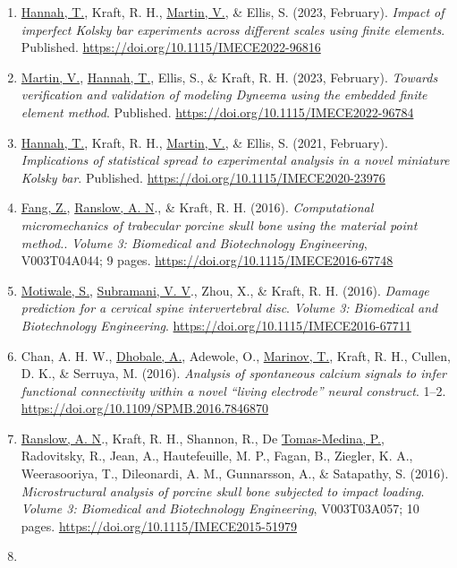 \documentclass[11pt]{article}
\begin{document}
\begin{enumerate}
\def\labelenumi{\arabic{enumi}.}
\item
  \underline{Hannah, T.}, Kraft, R. 
H., \underline{Martin, V.}, \& Ellis, S. 
(2023, February).
  \emph{Impact of imperfect Kolsky bar experiments across different
  scales using finite elements}. 
Published.
  \url{https://doi.org/10.1115/IMECE2022-96816}
\item
  \underline{Martin, V.}, \underline{Hannah, T.}, Ellis, S., \& Kraft, R. 
H. 
(2023, February).
  \emph{Towards verification and validation of modeling Dyneema using
  the embedded finite element method}. 
Published.
  \url{https://doi.org/10.1115/IMECE2022-96784}
\item
  \underline{Hannah, T.}, Kraft, R. 
H., \underline{Martin, V.}, \& Ellis, S. 
(2021, February).
  \emph{Implications of statistical spread to experimental analysis in a
  novel miniature Kolsky bar}. 
Published.
  \url{https://doi.org/10.1115/IMECE2020-23976}
\item
  \underline{Fang, Z.}, \underline{Ranslow, A. 
N}., \& Kraft, R. 
H. 
(2016). 
\emph{Computational
  micromechanics of trabecular porcine skull bone using the material
  point method.}. 
\emph{Volume 3: Biomedical and Biotechnology
  Engineering}, V003T04A044; 9 pages.
  \url{https://doi.org/10.1115/IMECE2016-67748}
\item
  \underline{Motiwale, S.}, \underline{Subramani, V. 
V}., Zhou, X., \& Kraft, R. 
H. 
(2016).
  \emph{Damage prediction for a cervical spine intervertebral disc}.
  \emph{Volume 3: Biomedical and Biotechnology Engineering}.
  \url{https://doi.org/10.1115/IMECE2016-67711}
\item
  Chan, A. 
H. 
W., \underline{Dhobale, A.}, Adewole, O., \underline{Marinov, T.}, Kraft, R. 
H.,
  Cullen, D. 
K., \& Serruya, M. 
(2016). 
\emph{Analysis of spontaneous
  calcium signals to infer functional connectivity within a novel
  ``living electrode'' neural construct}. 
1--2.
  \url{https://doi.org/10.1109/SPMB.2016.7846870}
\item
  \underline{Ranslow, A. 
N}., Kraft, R. 
H., Shannon, R., De \underline{Tomas-Medina, P.},
  Radovitsky, R., Jean, A., Hautefeuille, M. 
P., Fagan, B., Ziegler, K.
  A., Weerasooriya, T., Dileonardi, A. 
M., Gunnarsson, A., \& Satapathy,
  S. 
(2016). 
\emph{Microstructural analysis of porcine skull bone
  subjected to impact loading}. 
\emph{Volume 3: Biomedical and
  Biotechnology Engineering}, V003T03A057; 10 pages.
  \url{https://doi.org/10.1115/IMECE2015-51979}
\item

\end{enumerate}
\end{document}
